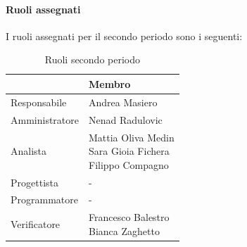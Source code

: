 \documentclass[a4paper,12pt]{article}
\begin{document}
            \paragraph{Ruoli assegnati}
            I ruoli assegnati per il secondo periodo sono i seguenti:
                \begin{table}[H]
                \centering
                \caption{Ruoli secondo periodo}
                \begin{tabular}{|l|l|}
                \hline
                    \rowcolor{lightgray}{\textbf{Ruolo}} & {\textbf{Membro}} \\
                \hline
                    Responsabile & Andrea Masiero \\
                \hline
                    Amministratore & Nenad Radulovic \\
                \hline
                    Analista & \makecell[l]{Mattia Oliva Medin \\ Sara Gioia Fichera \\ Filippo Compagno} \\
                \hline
                    Progettista & - \\
                \hline
                    Programmatore & - \\
                \hline
                    Verificatore & \makecell[l]{Francesco Balestro \\ Bianca Zaghetto} \\
                \hline
                \end{tabular}
                \end{table}
            
\end{document}
